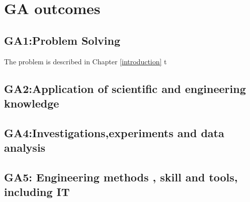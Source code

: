 \chapter{GA outcomes}
\section*{GA1:Problem Solving}
The problem is described in Chapter \ref{introduction} t
\section*{GA2:Application of scientific and engineering knowledge}
\section*{GA4:Investigations,experiments and data analysis}
\section*{GA5: Engineering methods , skill and tools, including IT}
